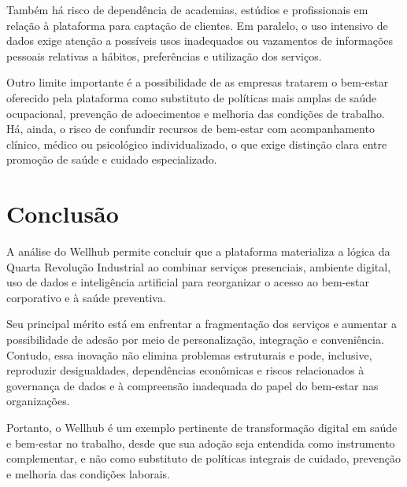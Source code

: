 \documentclass[12pt,a4paper]{article}
\begin{document}
Também há risco de dependência de academias, estúdios e profissionais em relação à plataforma para captação de clientes. Em paralelo, o uso intensivo de dados exige atenção a possíveis usos inadequados ou vazamentos de informações pessoais relativas a hábitos, preferências e utilização dos serviços.

Outro limite importante é a possibilidade de as empresas tratarem o bem-estar oferecido pela plataforma como substituto de políticas mais amplas de saúde ocupacional, prevenção de adoecimentos e melhoria das condições de trabalho. Há, ainda, o risco de confundir recursos de bem-estar com acompanhamento clínico, médico ou psicológico individualizado, o que exige distinção clara entre promoção de saúde e cuidado especializado.



\section{Conclusão}
\label{sec:orgfc62d08}

A análise do Wellhub permite concluir que a plataforma materializa a lógica da Quarta Revolução Industrial ao combinar serviços presenciais, ambiente digital, uso de dados e inteligência artificial para reorganizar o acesso ao bem-estar corporativo e à saúde preventiva.

Seu principal mérito está em enfrentar a fragmentação dos serviços e aumentar a possibilidade de adesão por meio de personalização, integração e conveniência. Contudo, essa inovação não elimina problemas estruturais e pode, inclusive, reproduzir desigualdades, dependências econômicas e riscos relacionados à governança de dados e à compreensão inadequada do papel do bem-estar nas organizações.

Portanto, o Wellhub é um exemplo pertinente de transformação digital em saúde e bem-estar no trabalho, desde que sua adoção seja entendida como instrumento complementar, e não como substituto de políticas integrais de cuidado, prevenção e melhoria das condições laborais.

\printbibliography
\end{document}
